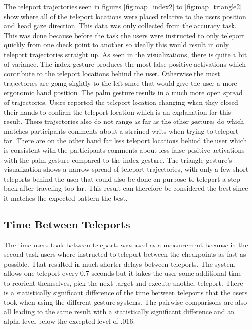 The teleport trajectories seen in figures \ref{fig:map_index2} to \ref{fig:map_triangle2} show where all of the teleport locations were placed relative to the users position and head gaze direction. This data was only collected from the accuracy task. This was done because before the task the users were instructed to only teleport quickly from one check point to another so ideally this would result in only teleport trajectories straight up. As seen in the visualizations, there is quite a bit of variance. The index gesture produces the most false positive activations which contribute to the teleport locations behind the user. Otherwise the most trajectories are going slightly to the left since that would give the user a more ergonomic hand position. The palm gesture results in a much more open spread of trajectories. Users reported the teleport location changing when they closed their hands to confirm the teleport location which is an explanation for this result. There trajectories also do not range as far as the other gestures do which matches participants comments about a strained writs when trying to teleport far. There are on the other hand far less teleport locations behind the user which is consistent with the participants comments about less false positive activations with the palm gesture compared to the index gesture. The triangle gesture's visualization shows a narrow spread of teleport trajectories, with only a few short teleports behind the user that could also be done on purpose to teleport a step back after traveling too far. This result can therefore be considered the best since it matches the expected pattern the best. 

\subsection{Time Between Teleports}
The time users took between teleports was used as a measurement because in the second task users where instructed to teleport between the checkpoints as fast as possible. That resulted in much shorter delays between teleports. The system allows one teleport every 0.7 seconds but it takes the user some additional time to reorient themselves, pick the next target and execute another teleport. There is a statistically significant difference of the time between teleports that the users took when using the different gesture systems. The pairwise comparisons are also all leading to the same result with a statistically significant difference and an alpha level below the excepted level of $.016$. 


